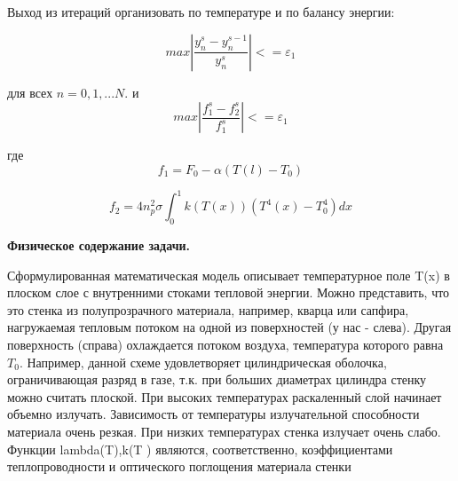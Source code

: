 \documentclass[a4paper,oneside,12pt]{extreport}
\begin{document}
Выход из итераций организовать по температуре и по балансу энергии:

\begin{equation*}
	max|\frac{y^s_n - y^{s-1}_n}{y^s_n}| <= \varepsilon_{1}
\end{equation*} 

\indent для всех $n = 0, 1, ... N.$ и \\

\begin{equation*}
	max|\frac{f^s_1 - f^s_2}{f^s_1}| <= \varepsilon_{1}
\end{equation*}

где \\

\begin{equation*}
	f_{1} = F_0 - \alpha(T(l) - T_{0})
\end{equation*}

\begin{equation*}
	f_{2}  = 4n^2_p \sigma \int^1_0 k(T(x))(T^4(x) - T^4_0) dx
\end{equation*}

\begin{figure}[ht!]
\end{figure}

\textbf{Физическое содержание задачи.} 

Сформулированная математическая модель описывает температурное поле T(x)
в плоском слое с внутренними стоками тепловой энергии. Можно представить, что это
стенка из полупрозрачного материала, например, кварца или сапфира, 
нагружаемая тепловым потоком на одной из поверхностей (у нас - слева). Другая поверхность (справа)
охлаждается потоком воздуха, температура которого равна $T_0$. Например, данной схеме
удовлетворяет цилиндрическая оболочка, ограничивающая разряд в газе, т.к. при больших
диаметрах цилиндра стенку можно считать плоской. При высоких температурах раскаленный слой начинает объемно излучать.
Зависимость от температуры излучательной способности материала очень резкая. При низких температурах стенка излучает очень слабо.
Функции lambda(T),k(T ) являются, соответственно, коэффициентами теплопроводности и оптического поглощения материала стенки
\end{document}
